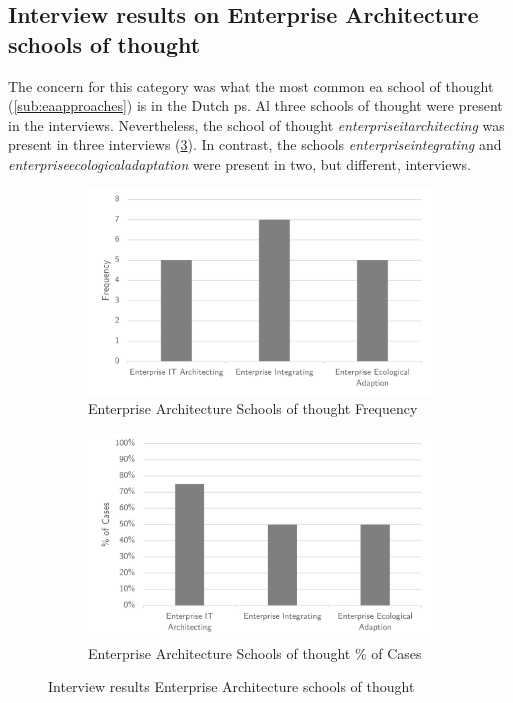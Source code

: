 \subsection{Interview results on Enterprise Architecture schools of thought}
\label{sub:interviewresultseaschools}
The concern for this category was what the most common \acrlong{ea} school of thought (\cref{sub:eaapproaches}) is in the Dutch \gls{ps}. Al three schools of thought were present in the interviews. Nevertheless, the school of thought \textit{\gls{enterpriseitarchitecting}} was present in three interviews (\cref{fig:intervieweaschoolsantifragile}). In contrast, the schools \textit{\gls{enterpriseintegrating}} and \textit{\gls{enterpriseecologicaladaptation}} were present in two, but different, interviews.
\begin{figure}[H]
	\centering
	\begin{subfigure}[H]{0.5\textwidth}
		\centering
		\includegraphics[width=0.95\linewidth]{images/easchools_frequency}
		\caption{Enterprise Architecture Schools of thought Frequency}
		\label{fig:easchoolsfrequency}
	\end{subfigure}%
	\begin{subfigure}[H]{0.5\textwidth}
		\centering
		\includegraphics[width=0.95\linewidth]{images/easchools_cases}
		\caption{Enterprise Architecture Schools of thought \% of Cases}
		\label{fig:easchoolscases}
	\end{subfigure}
	\caption{Interview results Enterprise Architecture schools of thought}
	\label{fig:intervieweaschoolsantifragile}
\end{figure}
